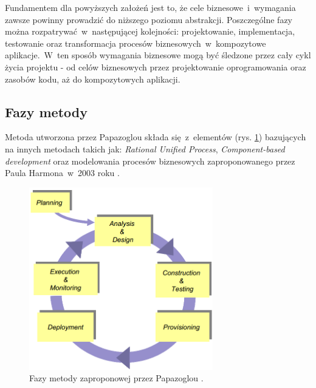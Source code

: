 Fundamentem dla powyższych założeń jest to, że cele biznesowe~i~wymagania zawsze powinny prowadzić do niższego poziomu abstrakcji. Poszczególne fazy można rozpatrywać~w~następującej kolejności: projektowanie, implementacja, testowanie oraz transformacja procesów biznesowych~w~kompozytowe aplikacje.~W~ten sposób wymagania biznesowe mogą być śledzone przez cały cykl życia projektu - od celów biznesowych przez projektowanie oprogramowania oraz zasobów kodu, aż do kompozytowych aplikacji.

\subsection{Fazy metody}
Metoda utworzona przez Papazoglou składa się~z~elementów (rys. \ref{papazoglou_method_phases}) bazujących na innych metodach takich jak: \emph{Rational Unified Process}, \emph{Component-based development} oraz modelowania procesów biznesowych zaproponowanego przez Paula Harmona~w~2003 roku \cite{PapaZog}. 

\begin{figure}[h!tbp]
\begin{centering}
\includegraphics[width=8cm]{img/papazoglou_metoda_fazy.png}
\caption[Fazy metody zaproponowej przez Papazoglou.]{Fazy metody zaproponowej przez Papazoglou \cite{PapaZog}.}\label{papazoglou_method_phases}
\end{centering}
\end{figure} 

